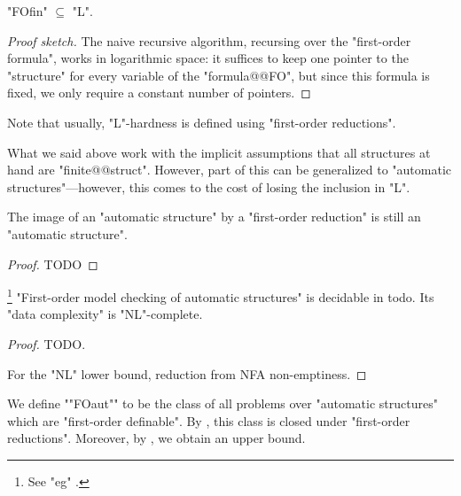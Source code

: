 \begin{proposition}[Folklore]
	\label{prop:FO-in-L}
	"FOfin" $\subseteq$ "L".
\end{proposition}

\begin{proof}[Proof sketch]
	The naive recursive algorithm, recursing over the "first-order formula",
	works in logarithmic space: it suffices to keep one pointer to the "structure"
	for every variable of the "formula@@FO", but since this formula is fixed, we only
	require a constant number of pointers.
\end{proof}

Note that usually, "L"-hardness is defined using "first-order reductions".

What we said above work with the implicit assumptions that all structures at hand are 
"finite@@struct". However, part of this can be generalized to "automatic structures"---however, this comes to the cost of losing the inclusion in "L".

\begin{proposition}[Folklore]
	\AP\label{prop:first-order-reduction-preserve-automaticity}
	The image of an "automatic structure" by a "first-order reduction" is
	still an "automatic structure".
\end{proposition}
\begin{proof}
	TODO
\end{proof}


\begin{proposition}
	\!\footnote{See "eg" \cite[Theorem XII.1.7]{Blumensath2024MSOModelTheory}.}
	\label{prop:first-order-model-checking-automatic-structures}
	"First-order model checking of automatic structures" is decidable in todo.
	Its "data complexity" is "NL"-complete.
\end{proposition}

\begin{proof}
	TODO.

	For the "NL" lower bound, reduction from NFA non-emptiness.
\end{proof}

We define \AP""FOaut"" to be the class of all problems over "automatic structures"
which are "first-order definable". By ,
this class is closed under "first-order reductions". Moreover,
by , we obtain an upper bound.

